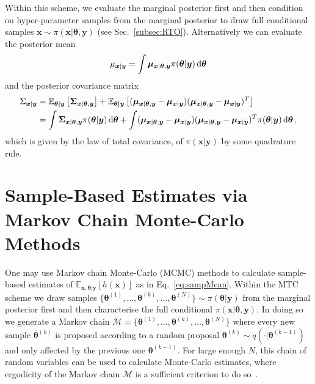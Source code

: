 \begin{mccorrection}
Within this scheme, we evaluate the marginal posterior first and then condition on hyper-parameter samples from the marginal posterior to draw full conditional samples $\bm{x} \sim \pi (\bm{x} | \bm{\theta}, \bm{y})$ (see Sec.~\ref{subsec:RTO}).
Alternatively we can evaluate the posterior mean
\begin{align}
	\mu_{\bm{x}|\bm{y}} = \int \bm{\mu}_{\bm{x} | \bm{\theta} , \bm{y}} \pi(\bm{\theta}| \bm{y}) \mathop{}\!\mathrm{d} \bm{\theta} \label{eq:MeanGenInt}
\end{align} and the posterior covariance matrix
\begin{align}
	\Sigma_{\bm{x}|\bm{y}} &= \mathbb{E}_{\bm{\theta|\bm{y}}} \left[\bm{\Sigma}_{\bm{x}|\bm{\theta} ,\bm{y}}\right] + \mathbb{E}_{\bm{\theta|\bm{y}}} \left[ (\bm{\mu}_{\bm{x}|\bm{\theta} ,\bm{y}} - \bm{\mu}_{\bm{x}|\bm{y}} ) (\bm{\mu}_{\bm{x}|\bm{\theta} ,\bm{y}} - \bm{\mu}_{\bm{x}|\bm{y}} )^T \right]   \\
	 &= \int \bm{\Sigma}_{\bm{x} | \bm{\theta} , \bm{y}} \pi(\bm{\theta}| \bm{y}) \mathop{}\!\mathrm{d} \bm{\theta} + \int (\bm{\mu}_{\bm{x}|\bm{\theta} ,\bm{y}} - \bm{\mu}_{\bm{x}|\bm{y}} ) (\bm{\mu}_{\bm{x}|\bm{\theta} ,\bm{y}} - \bm{\mu}_{\bm{x}|\bm{y}} )^T  \pi(\bm{\theta}| \bm{y}) \mathop{}\!\mathrm{d} \bm{\theta} \label{eq:CoVarGenInt} \, ,
\end{align}
which is given by the law of total covariance, of $\pi(\bm{x}| \bm{y})$ by some quadrature rule.
\end{mccorrection}



\section{Sample-Based Estimates via Markov Chain Monte-Carlo Methods}
One may use Markov chain Monte-Carlo (MCMC) methods to calculate sample-based estimates of $\mathbb{E}_{\bm{x} ,\bm{\theta}  |\bm{y}} [h(\bm{x})] $ as in Eq.~\ref{eq:sampMean}.
Within the MTC scheme we draw samples $\{  \bm{\theta}^{(1)}, \dots,  \bm{\theta}^{(k)}, \dots, \bm{\theta}^{(N)} \} \sim \pi(\bm{\theta} | \bm{y})$ from the marginal posterior first and then characterise the full conditional $\pi(\bm{x}|\bm{\theta} , \bm{y})$.
In doing so we generate a Markov chain $\mathcal{M} = \{  \bm{\theta}^{(1)}, \dots,  \bm{\theta}^{(k)}, \dots, \bm{\theta}^{(N)} \} $ where every new sample $\bm{\theta}^{(k)}$ is proposed according to a random proposal $\bm{\theta}^{(k)} \sim q( \cdot |  \bm{\theta}^{(k-1)})$ and only affected by the previous one $\bm{\theta}^{(k-1)}$.
For large enough $N$, this chain of random variables can be used to calculate Monte-Carlo estimates, where ergodicity of the Markov chain $\mathcal{M}$ is a sufficient criterion to do so~\cite{tan2016LecNot, roberts2004general}.

